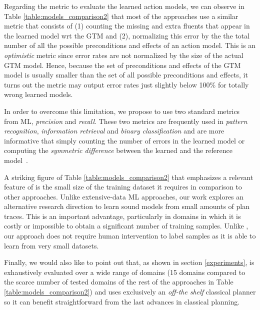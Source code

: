Regarding the metric to evaluate the learned action models, we can observe in Table \ref{table:models_comparison2} that most of the approaches use a similar metric that consists of (1) counting the missing and extra fluents that appear in the learned model wrt the GTM and (2), normalizing this error by the the total number of all the possible preconditions and effects of an action model. This is an \emph{optimistic} metric since error rates are not normalized by the size of the actual GTM model. Hence, because the set of preconditions and effects of the GTM model is usually smaller than the set of all possible preconditions and effects, it turns out the metric may output error rates just slightly below 100\% for totally wrong learned models.


In order to overcome this limitation, we propose to use two standard metrics from ML, {\em precision} and {\em recall}. These two metrics are frequently used in {\em pattern recognition}, {\em information retrieval} and {\em binary classification} and are more informative that simply counting the number of errors in the learned model or computing the {\em symmetric difference} between the learned and the reference model~\cite{davis2006relationship}.

A striking figure of Table \ref{table:models_comparison2} that emphasizes a relevant feature of \FAMA is the small size of the training dataset it requires in comparison to other approaches. Unlike extensive-data ML approaches, our work explores an alternative research direction to learn sound models from small amounts of plan traces. This is an important advantage, particularly in domains in which it is costly or impossible to obtain a significant number of training samples. Unlike \CAMA, our approach does not require human intervention to label samples as it is able to learn from very small datasets.

Finally, we would also like to point out that, as shown in section \ref{experiments}, \FAMA is exhaustively evaluated over a wide range of domains (15 domains compared to the scarce number of tested domains of the rest of the approaches in Table \ref{table:models_comparison2}) and uses exclusively an \emph{off-the shelf} classical planner so it can benefit straightforward from the last advances in classical planning.




























